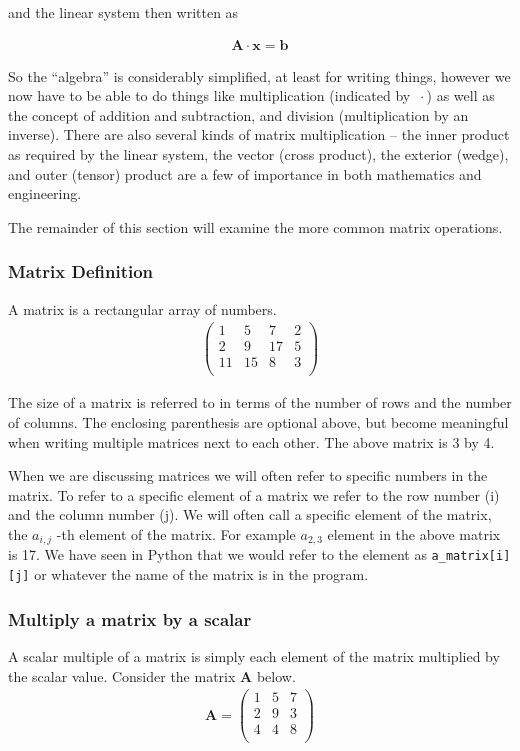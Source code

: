 and the linear system then written as

\begin{gather}
\mathbf{A} \cdot \mathbf{x} = \mathbf{b}
\end{gather}

So the ``algebra'' is considerably simplified, at least for writing things, 
however we now have to be able to do things like multiplication (indicated by $ ~\cdot $) as well as the concept of addition and subtraction, and division (multiplication by an inverse).  
There are also several kinds of matrix multiplication -- the inner product as required by the linear system, the vector (cross product), the exterior (wedge), and outer (tensor) product are a few of importance in both mathematics and engineering. 

The remainder of this section will examine the more common matrix operations.
\subsubsection{Matrix Definition}
A matrix is a rectangular array of numbers.
\begin{gather}
\begin{pmatrix}
1 & 5 & 7 & 2\\
2 & 9 & 17 & 5 \\
11 & 15 & 8 & 3 \\
\end{pmatrix}
\end{gather}

The size of a matrix is referred to in terms of the number of rows and the number of columns.  The enclosing parenthesis are optional above, but become meaningful when writing multiple matrices next to each other.
The above matrix is 3 by 4.  

When we are discussing matrices we will often refer to specific numbers in the matrix.  
To refer to a specific element of a matrix we refer to the row number (i) and the column number (j).  
We will often call a specific element of the matrix, the $a_{i,j}$ -th element of the matrix.  For example $a_{2,3}$ element in the above matrix is 17.  We have seen in Python that we would refer to the element as \texttt{a\_matrix[i][j]} or whatever the name of the matrix is in the program.

\subsubsection{Multiply a matrix by a scalar}
A scalar multiple of a matrix is simply each element of the matrix multiplied by the scalar value.
 Consider the matrix $\mathbf{A}$ below.
\begin{gather}
\mathbf{A}=
\begin{pmatrix}
1 & 5 & 7 \\
2 & 9 & 3 \\
4 & 4 & 8 \\
\end{pmatrix}
\end{gather}

